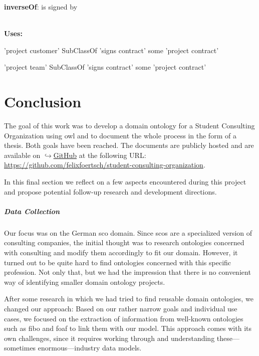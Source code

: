 \documentclass[a4paper, DIV=13, BCOR=0cm]{scrbook}
\newcommand{\link}[2]{\href{#1}{$\hookrightarrow$#2}}
\begin{document}
\begin{mdframed}[style=onto, frametitle={signs contract}]
	{%
		\begin{compactitem}
			\item \textbf{inverseOf}: is signed by
		\end{compactitem}
		\hrulefill\\
		\textbf{Uses:}
		\begin{compactitem}
			\item 'project customer' SubClassOf 'signs contract' some 'project contract'
			\item 'project team' SubClassOf 'signs contract' some 'project contract'
		\end{compactitem}
	} %
\end{mdframed}

\chapter{Conclusion}
The goal of this work was to develop a domain ontology for a Student Consulting Organization using \gls{owl} and to document the whole process in the form of a thesis. Both goals have been reached. The documents are publicly hosted and are available on \link{https://github.com}{GitHub} at the following URL: \url{https://github.com/felixfoertsch/student-consulting-organization}.

In this final section we reflect on a few aspects encountered during this project and propose potential follow-up research and development directions.

\paragraph{Data Collection}
Our focus was on the German \gls{sco} domain. Since \glspl{sco} are a specialized version of consulting companies, the initial thought was to research ontologies concerned with consulting and modify them accordingly to fit our domain. However, it turned out to be quite hard to find ontologies concerned with this specific profession. Not only that, but we had the impression that there is no convenient way of identifying smaller domain ontology projects.

After some research in which we had tried to find reusable domain ontologies, we changed our approach: Based on our rather narrow goals and individual use cases, we focused on the extraction of information from well-known ontologies such as \gls{fibo} and \gls{foaf} to link them with our model. This approach comes with its own challenges, since it requires working through and understanding these---sometimes enormous---industry data models.
\end{document}
